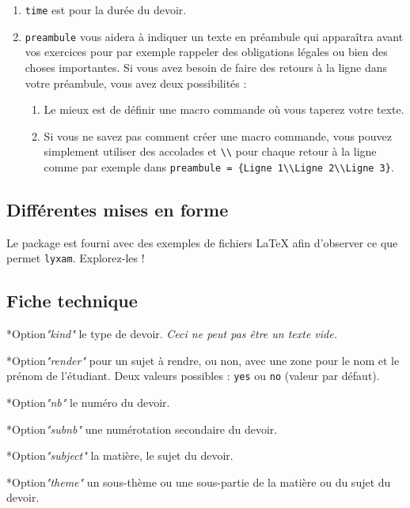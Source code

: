 \documentclass[12pt,a4paper]{article}
\makeatletter
\theoremstyle{definition}
\newcommand\IDmacro{\@ifstar{\@IDmacroStar}{\@IDmacroNoStar}}
\newcommand\@IDmacroNoStar[3]{%
        \texttt{%
        	\textbackslash#1%
        	\IfStrEq{#2}{0}{}{%
        		\,\,[#2 Option%
				\IfStrEq{#2}{1}{}{s}]%
			}%
    	    \IfStrEq{#3}{}{}{%
	    		\,\,(#3 Argument%
				\IfStrEq{#3}{1}{}{s})%
			}
	   	}
        \immediate\write\tempfile{macro@#1@#2@#3}%
    }
\newcommand\@IDmacroStar[2]{%
        \@IDmacroNoStar{#1}{0}{#2}%
    }
\newcommand\@IDoptarg{\@ifstar{\@IDoptargStar}{\@IDoptargNoStar}}
\newcommand\@IDoptargStar[2]{%
    	\vspace{0.5em}
		--- \texttt{#1%
			\IfStrEq{#2}{}{:}{\,#2:}%
		}%
	}
\newcommand\@IDoptargNoStar[2]{%
    	\IfStrEq{#2}{}{%
			\@IDoptargStar{#1}{}%
		}{%
			\@IDoptargStar{#1}{\##2}%
		}%
	}
\newcommand\IDkey[1]{%
    	\@IDoptarg*{Option}{{\itshape "#1"}}%
	}
\makeatother
\begin{document}
\begin{enumerate}
	\item \verb+time+ est pour la durée du devoir.

	\item \verb+preambule+ vous aidera à indiquer un texte en préambule qui apparaîtra avant vos exercices pour par exemple rappeler des obligations légales ou bien des choses importantes.
	 Si vous avez besoin de faire des retours à la ligne dans votre préambule, vous avez deux possibilités :

	 \begin{enumerate}
		\item Le mieux est de définir une macro commande où vous taperez votre texte.

		\item Si vous ne savez pas comment créer une macro commande, vous pouvez simplement utiliser des accolades et \verb+\\+ pour chaque retour à la ligne comme par exemple dans \verb+preambule = {Ligne 1\\Ligne 2\\Ligne 3}+.
	\end{enumerate}
\end{enumerate}


	\subsection{Différentes mises en forme}

Le package est fourni avec des exemples de fichiers \LaTeX{} afin d'observer ce que permet \verb+lyxam+. Explorez-les !


	\subsection{Fiche technique}

\IDmacro{exam}{12}{0}

\IDkey{kind} le type de devoir. \emph{Ceci ne peut pas être un texte vide.}

\IDkey{render} pour un sujet à rendre, ou non, avec une zone pour le nom et le prénom de l'étudiant. Deux valeurs possibles : \verb+yes+ ou \verb+no+ (valeur par défaut).

\IDkey{nb} le numéro du devoir.

\IDkey{subnb} une numérotation secondaire du devoir.

\IDkey{subject} la matière, le sujet du devoir.

\IDkey{theme} un sous-thème ou une sous-partie de la matière ou du sujet du devoir.
\end{document}

